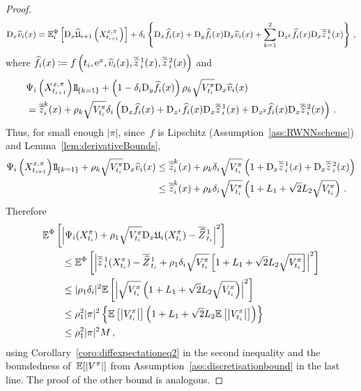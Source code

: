\begin{proof}
\begin{equation}
        \mathrm{D}_{x} \widehat v_i(x) =  \mathbb{E}^\Phi_{i}\left[\mathrm{D}_{x}\widehat{\mathfrak{U}}_{i+1}\left(X^{x,\pi}_{t_{i+1}}\right)\right] + \delta_{i} \left\{\mathrm{D}_{x} \widehat f_i(x) + \mathrm{D}_y \widehat f_i(x)\mathrm{D}_{x} \widehat v_i(x)
        + \sum_{k=1}^{2}\mathrm{D}_{z^k} \widehat f_i(x) \mathrm{D}_{x} \overline{\widehat{z}}\,^{k}_{i}(x)\right\}\,,
    \end{equation}
    where $\widehat f_i(x) \coloneqq  f\left(t_i, \mathrm{e}^{x}, \widehat{v}_{i}(x), \overline{\widehat{z}}\,^{1}_{i}(x), \overline{\widehat{z}}\,^{2}_{i}(x)\right)$ and
    \begin{align*}
        & \Psi_i\left(X^{x,\pi}_{t_{i+1}}\right)\ind_{\{k=1\}} + \left(1-\Deli \Dr_y\widehat f_i(x)\right)\rho_k\sqrt{V^{\pi}_{t_i}}\Dx \widehat v_i(x) \\
        & = \overline{\widehat{z}}^k_{i}(x)  + \rho_k\sqrt{V^{\pi}_{t_i}}\Deli \left(\Dx \widehat f_i(x) + \Dr_{z^1} \widehat f_i(x) \Dx \zowO_{i}(x) + \Dr_{z^2} \widehat f_i(x)\Dx \zowT_{i}(x)\right)\,.
    \end{align*}
    Thus, for small enough $|\pi|$, since~$f$ is Lipschitz  (Assumption~\ref{ass:RWNNscheme}) and Lemma~\ref{lem:derivativeBounds}, 
    \begin{align*}
        \Psi_i\left(X^{x,\pi}_{t_{i+1}}\right)\ind_{\{k=1\}} + \rho_k\sqrt{V^{\pi}_{t_i}}\Dx \widehat v_i(x) &\leq \overline{\widehat{z}}^k_{i}(x) + \rho_k\Deli  \sqrt{V^{\pi}_{t_i}}\left(1+\Dx \zowO_{i}(x) + \Dx \zowT_{i}(x)\right) \\
        &\leq \overline{\widehat{z}}^k_{i}(x) + \rho_k\Deli \sqrt{V^{\pi}_{t_i}}\left(1 + L_1 + \sqrt{2} L_2 \sqrt{V^{\pi}_{t_i}}\right)\,.
    \end{align*}
Therefore
\begin{align*}
 & \mathbb{E}^\Phi\left[\left| \Psi_i(X^\pi_{t_i}) + \rho_1\sqrt{V^\pi_{t_i}}\mathrm{D}_{x}\mathfrak{U}_i(X^\pi_{t_i}) - \overline{\widehat{Z}}\kern0.1em^{1}_{t_i}\right|^2 \right]  \\
    &\qquad \leq 
    \mathbb{E}^\Phi\left[\left| \overline{\widehat{z}}\,^{1}_{i}(X^\pi_{t_i}) - \overline{\widehat{Z}}\kern0.1em^{1}_{t_i} + \rho_1\delta_{i} \sqrt{V^\pi_{t_i}}\left[1 + L_1 + \sqrt{2} L_2 \sqrt{V^\pi_{t_i}}\right]\right|^2 \right] \\
    &\qquad \leq 
    |\rho_1\delta_{i} |^2 \mathbb{E}\left[\left|  \sqrt{V^\pi_{t_i}}\left(1+L_1+\sqrt{2}L_2\sqrt{V^\pi_{t_i}}\right)\right|^2 \right] \\
    &\qquad \leq 
    \rho_1^2|\pi|^2 \left\{\mathbb{E}\left[\left|V^\pi_{t_i}\right| \right]\left(1 + L_1 + \sqrt{2}L_2\mathbb{E}\left[\left|V^\pi_{t_i}\right| \right]\right)\right\} \\
    & \qquad \leq \rho_1^2|\pi|^2 M\,,
\end{align*}
using Corollary~\ref{coro:diffexpectationeq2} in the second inequality and the boundedness of~$\mathbb{E}[|V^{\pi}|]$ from Assumption~\ref{ass:discretisationbound}
in the last line.
The proof of the other bound is analogous.
\end{proof}

